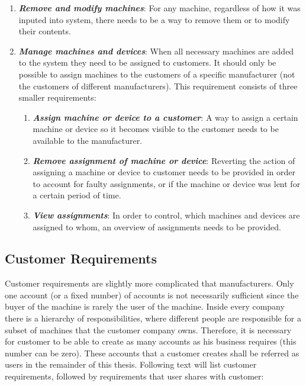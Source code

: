 \begin{enumerate}
	\item \textbf{\textit{Remove and modify machines}}: For any machine, regardless of how it was inputed into system, there needs to be a way to remove them or to modify their contents.

	\item \textbf{\textit{Manage machines and devices}}: When all necessary machines are added to the system they need to be assigned to customers. It should only be possible to assign machines to the customers of a specific manufacturer (not the customers of different manufacturers). This requirement consists of three smaller requirements:
		\begin{enumerate}
			\item \textbf{\textit{Assign machine or device to a customer}}: A way to assign a certain machine or device so it becomes visible to the customer needs to be available to the manufacturer.
			\item \textbf{\textit{Remove assignment of machine or device}}: Reverting the action of assigning a machine or device to customer needs to be provided in order to account for faulty assignments, or if the machine or device was lent for a certain period of time.
			\item \textbf{\textit{View assignments}}: In order to control, which machines and devices are assigned to whom, an overview of assignments needs to be provided.
		\end{enumerate}
\end{enumerate}

\subsection{Customer Requirements}

Customer requirements are slightly more complicated that manufacturers. Only one account (or a fixed number) of accounts is not necessarily sufficient since the buyer of the machine is rarely the user of the machine. Inside every company there is a hierarchy of responsibilities, where different people are responsible for a subset of machines that the customer company owns. Therefore, it is necessary for customer to be able to create as many accounts as his business requires (this number can be zero). These accounts that a customer creates shall be referred as users in the remainder of this thesis. Following text will list customer requirements, followed by requirements that user shares with customer:

